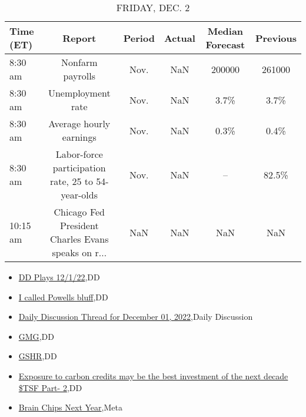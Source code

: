 \documentclass{article}%
\begin{document}
%


\begin{table}[htbp]%
\caption{FRIDAY, DEC. 2}%
\centering%
\begin{adjustbox}{width=1\textwidth}%
\begin{tabular}{lccccc}
\toprule
Time (ET) &                                             Report & Period & Actual & Median Forecast & Previous \\
\midrule
  8:30 am &                                   Nonfarm payrolls &   Nov. &    NaN &          200000 &   261000 \\
  8:30 am &                                  Unemployment rate &   Nov. &    NaN &            3.7\% &     3.7\% \\
  8:30 am &                            Average hourly earnings &   Nov. &    NaN &            0.3\% &     0.4\% \\
  8:30 am & Labor-force participation rate, 25 to 54-year-olds &   Nov. &    NaN &              -- &    82.5\% \\
 10:15 am & Chicago Fed President Charles Evans speaks on r... &    NaN &    NaN &             NaN &      NaN \\
\bottomrule
\end{tabular}
%
\end{adjustbox}%
\end{table}

%
\begin{itemize}%
\item%
\href{https://reddit.com/r/wallstreetbets/comments/z9mo7j/dd\_plays\_12122/}{DD Plays 12/1/22},DD%
\item%
\href{https://reddit.com/r/wallstreetbets/comments/z9ld64/i\_called\_powells\_bluff/}{I called Powells bluff},DD%
\item%
\href{https://reddit.com/r/wallstreetbets/comments/z9kzni/daily\_discussion\_thread\_for\_december\_01\_2022/}{Daily Discussion Thread for December 01, 2022},Daily Discussion%
\item%
\href{https://reddit.com/r/Baystreetbets/comments/z97tlv/gmg/}{GMG},DD%
\item%
\href{https://reddit.com/r/Baystreetbets/comments/z93hri/gshr/}{GSHR},DD%
\item%
\href{https://reddit.com/r/Baystreetbets/comments/z8yv1e/exposure\_to\_carbon\_credits\_may\_be\_the\_best/}{Exposure to carbon credits may be the best investment of the next decade \$TSF Part- 2},DD%
\item%
\href{https://reddit.com/r/StockMarket/comments/z9iijc/brain\_chips\_next\_year/}{Brain Chips Next Year},Meta%
\end{itemize}%
\end{document}

